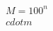 \documentclass[preview]{standalone}
\begin{document}
\begin{align*}
M = 100^n \\cdot m
\end{align*}
\end{document}
